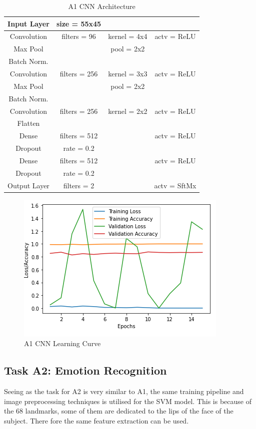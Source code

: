 \documentclass{article}
\begin{document}
 	\begin{table}[]
 		\begin{tabular}{|c|c c c|}
 			\hline
 			Input Layer & size = 55x45 	&				&	\\
 			\hline
 			Convolution & filters = 96 	& kernel = 4x4 	& actv = ReLU\\
 			\hline
 			Max Pool	&				& pool = 2x2  	& \\
 			\hline
 			Batch Norm. & 				&				&\\
 			\hline
 			Convolution & filters = 256 & kernel = 3x3 	& actv = ReLU\\
 			\hline
 			Max Pool	&				& pool = 2x2	&\\
 			\hline
 			Batch Norm. &				&				&\\
 			\hline
 			Convolution & filters = 256 & kernel = 2x2	& actv = ReLU\\
 			\hline
 			Flatten 	& 				& 				&\\
 			\hline
 			Dense 		& filters = 512 &				& actv = ReLU\\
 			\hline
 			Dropout 	&	rate = 0.2 	&	 			&\\
 			\hline
 			Dense 		& filters = 512 &				& actv = ReLU\\
 			\hline
 			Dropout 	& rate = 0.2 	& 				&\\
 			\hline
 			Output Layer& filters = 2 	&				& actv = SftMx\\
 			\hline
 		\end{tabular}
 	\caption{A1 CNN Architecture}
 	\label{table:A1_Arch}
 	\end{table} 
    \begin{figure}[htb]
		\centering
		\includegraphics[scale=0.7]{Figures/A1_CNN_Graph.PNG}
		\caption{A1 CNN Learning Curve}
		\label{fig:A1_curve}
	\end{figure} 	
    \subsection{Task A2: Emotion Recognition}
    Seeing as the task for A2 is very similar to A1, the same training pipeline and image preprocessing techniques is utilised for the SVM model. This is because of the 68 landmarks, some of them are dedicated to the lips of the face of the subject. There fore the same feature extraction can be used.\\
    
\end{document}
